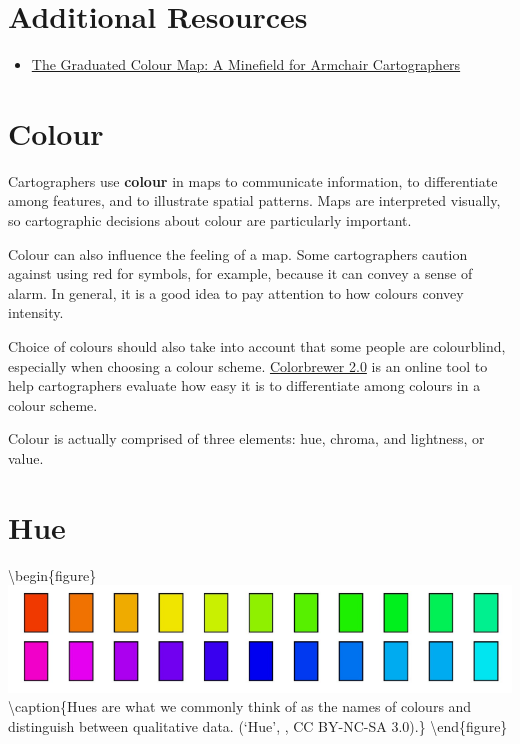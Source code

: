 \documentclass[
]{book}
\providecommand{\tightlist}{%
  \setlength{\itemsep}{0pt}\setlength{\parskip}{0pt}}
\begin{document}
\hypertarget{additional-resources}{%
\section{Additional Resources}\label{additional-resources}}

\begin{itemize}
\tightlist
\item
  \href{https://gis.blog.ryerson.ca/2020/03/26/the-graduated-colour-map-a-minefield-for-armchair-cartographers/}{The Graduated Colour Map: A Minefield for Armchair Cartographers}
\end{itemize}

\hypertarget{colour}{%
\section{Colour}\label{colour}}

Cartographers use \textbf{colour} in maps to communicate information, to differentiate among features, and to illustrate spatial patterns. Maps are interpreted visually, so cartographic decisions about colour are particularly important.

Colour can also influence the feeling of a map. Some cartographers caution against using red for symbols, for example, because it can convey a sense of alarm. In general, it is a good idea to pay attention to how colours convey intensity.

Choice of colours should also take into account that some people are colourblind, especially when choosing a colour scheme. \href{https://colorbrewer2.org/\#type=sequential\&scheme=BuGn\&n=3}{Colorbrewer 2.0} is an online tool to help cartographers evaluate how easy it is to differentiate among colours in a colour scheme.

Colour is actually comprised of three elements: hue, chroma, and lightness, or value.

\hypertarget{hue}{%
\section{Hue}\label{hue}}

\textbackslash begin\{figure\}
\includegraphics[width=0.8\linewidth]{images/17-hue} \textbackslash caption\{Hues are what we commonly think of as the names of colours and distinguish between qualitative data. (`Hue', \citet{manson_hue_2013}, CC BY-NC-SA 3.0).\}\label{fig:17-hue}
\textbackslash end\{figure\}
\end{document}
